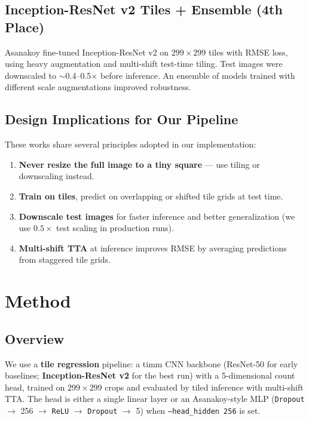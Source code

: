 \documentclass[12pt, a4paper]{article}
\begin{document}
\subsection{Inception-ResNet v2 Tiles + Ensemble (4th Place)}
Asanakoy \cite{asanakoy2017} fine-tuned Inception-ResNet v2 on $299\times299$ tiles with RMSE loss, using heavy augmentation and multi-shift test-time tiling. Test images were downscaled to $\sim$0.4--0.5$\times$ before inference. An ensemble of models trained with different scale augmentations improved robustness.

\subsection{Design Implications for Our Pipeline}
These works share several principles adopted in our implementation:
\begin{enumerate}
    \item \textbf{Never resize the full image to a tiny square} --- use tiling or downscaling instead.
    \item \textbf{Train on tiles}, predict on overlapping or shifted tile grids at test time.
    \item \textbf{Downscale test images} for faster inference and better generalization (we use $0.5\times$ test scaling in production runs).
    \item \textbf{Multi-shift TTA} at inference improves RMSE by averaging predictions from staggered tile grids.
\end{enumerate}

\section{Method}

\subsection{Overview}
We use a \textbf{tile regression} pipeline: a timm CNN backbone (ResNet-50 for early baselines; \textbf{Inception-ResNet v2} for the best run) with a 5-dimensional count head, trained on $299\times299$ crops and evaluated by tiled inference with multi-shift TTA. The head is either a single linear layer or an Asanakoy-style MLP (\texttt{Dropout} $\rightarrow$ 256 $\rightarrow$ \texttt{ReLU} $\rightarrow$ \texttt{Dropout} $\rightarrow$ 5) when \texttt{--head\_hidden 256} is set.
\end{document}
